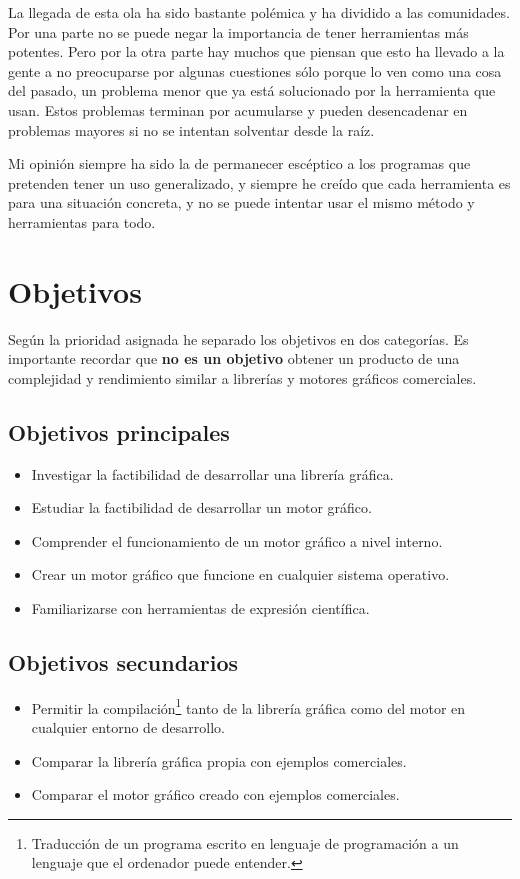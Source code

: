 La llegada de esta ola ha sido bastante polémica y ha dividido a las comunidades. Por una parte no se puede negar la importancia de tener herramientas más potentes. Pero por la otra parte hay muchos que piensan que esto ha llevado a la gente a no preocuparse por algunas cuestiones sólo porque lo ven como una cosa del pasado, un problema menor que ya está solucionado por la herramienta que usan. Estos problemas terminan por acumularse y pueden desencadenar en problemas mayores si no se intentan solventar desde la raíz.

Mi opinión siempre ha sido la de permanecer escéptico a los programas que pretenden tener un uso generalizado, y siempre he creído que cada herramienta es para una situación concreta, y no se puede intentar usar el mismo método y herramientas para todo.

\section{Objetivos}
Según la prioridad asignada he separado los objetivos en dos categorías. Es importante recordar que \textbf{no es un objetivo} obtener un producto de una complejidad y rendimiento similar a librerías y motores gráficos comerciales.
\subsection{Objetivos principales}
\begin{itemize}
\item Investigar la factibilidad de desarrollar una librería gráfica.
\item Estudiar la factibilidad de desarrollar un motor gráfico.
\item Comprender el funcionamiento de un motor gráfico a nivel interno.
\item Crear un motor gráfico que funcione en cualquier sistema operativo.
\item Familiarizarse con herramientas de expresión científica.
\end{itemize} 
\subsection{Objetivos secundarios}
\begin{itemize}
\item Permitir la compilación\footnote{Traducción de un programa escrito en lenguaje de programación a un lenguaje que el ordenador puede entender.} tanto de la librería gráfica como del motor en cualquier entorno de desarrollo.
\item Comparar la librería gráfica propia con ejemplos comerciales.
\item Comparar el motor gráfico creado con ejemplos comerciales.
\end{itemize}


